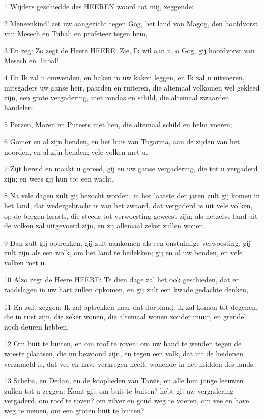 \par 1 Wijders geschiedde des HEEREN woord tot mij, zeggende:
\par 2 Mensenkind! zet uw aangezicht tegen Gog, het land van Magog, den hoofdvorst van Mesech en Tubal; en profeteer tegen hem,
\par 3 En zeg: Zo zegt de Heere HEERE: Zie, Ik wil aan u, o Gog, gij hoofdvorst van Mesech en Tubal!
\par 4 En Ik zal u omwenden, en haken in uw kaken leggen, en Ik zal u uitvoeren, mitsgaders uw ganse heir, paarden en ruiteren, die altemaal volkomen wel gekleed zijn, een grote vergadering, met rondas en schild, die altemaal zwaarden handelen;
\par 5 Perzen, Moren en Puteers met hen, die altemaal schild en helm voeren;
\par 6 Gomer en al zijn benden, en het huis van Togarma, aan de zijden van het noorden, en al zijn benden; vele volken met u.
\par 7 Zijt bereid en maakt u gereed, gij en uw ganse vergadering, die tot u vergaderd zijn; en wees gij hun tot een wacht.
\par 8 Na vele dagen zult gij bezocht worden; in het laatste der jaren zult gij komen in het land, dat wedergebracht is van het zwaard, dat vergaderd is uit vele volken, op de bergen Israels, die steeds tot verwoesting geweest zijn; als hetzelve land uit de volken zal uitgevoerd zijn, en zij allemaal zeker zullen wonen.
\par 9 Dan zult gij optrekken, gij zult aankomen als een onstuimige verwoesting, gij zult zijn als een wolk, om het land te bedekken; gij en al uw benden, en vele volken met u.
\par 10 Alzo zegt de Heere HEERE: Te dien dage zal het ook geschieden, dat er raadslagen in uw hart zullen opkomen, en gij zult een kwade gedachte denken,
\par 11 En zult zeggen: Ik zal optrekken naar dat dorpland, ik zal komen tot degenen, die in rust zijn, die zeker wonen, die altemaal wonen zonder muur, en grendel noch deuren hebben.
\par 12 Om buit te buiten, en om roof te roven; om uw hand te wenden tegen de woeste plaatsen, die nu bewoond zijn, en tegen een volk, dat uit de heidenen verzameld is, dat vee en have verkregen heeft, wonende in het midden des lands.
\par 13 Scheba, en Dedan, en de kooplieden van Tarsis, en alle hun jonge leeuwen zullen tot u zeggen: Komt gij, om buit te buiten? hebt gij uw vergadering vergaderd, om roof te roven? om zilver en goud weg te voeren, om vee en have weg te nemen, om een groten buit te buiten?
